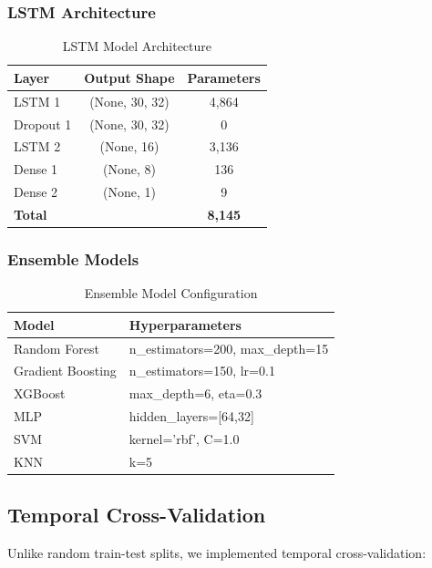 \documentclass[conference,11pt]{IEEEtran}
\begin{document}
\subsubsection{LSTM Architecture}

\begin{table}[h]
\centering
\caption{LSTM Model Architecture}
\begin{tabular}{|l|c|c|}
\hline
\textbf{Layer} & \textbf{Output Shape} & \textbf{Parameters} \\
\hline
LSTM 1 & (None, 30, 32) & 4,864 \\
\hline
Dropout 1 & (None, 30, 32) & 0 \\
\hline
LSTM 2 & (None, 16) & 3,136 \\
\hline
Dense 1 & (None, 8) & 136 \\
\hline
Dense 2 & (None, 1) & 9 \\
\hline
\textbf{Total} & & \textbf{8,145} \\
\hline
\end{tabular}
\end{table}

\subsubsection{Ensemble Models}

\begin{table}[h]
\centering
\caption{Ensemble Model Configuration}
\begin{tabular}{|l|l|}
\hline
\textbf{Model} & \textbf{Hyperparameters} \\
\hline
Random Forest & n\_estimators=200, max\_depth=15 \\
\hline
Gradient Boosting & n\_estimators=150, lr=0.1 \\
\hline
XGBoost & max\_depth=6, eta=0.3 \\
\hline
MLP & hidden\_layers=[64,32] \\
\hline
SVM & kernel='rbf', C=1.0 \\
\hline
KNN & k=5 \\
\hline
\end{tabular}
\end{table}

\subsection{Temporal Cross-Validation}

Unlike random train-test splits, we implemented temporal cross-validation:
\end{document}
